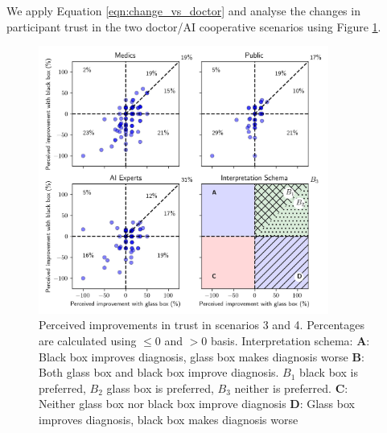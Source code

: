 \documentclass[manuscript,screen,review]{acmart}
\begin{document}










We apply Equation \ref{eqn:change_vs_doctor} and analyse the changes in participant trust in the two doctor/AI cooperative scenarios using Figure \ref{fig:improvement}.

\begin{figure}[h!]
    \centering
    \includegraphics[width=0.85\textwidth]{graphics/Doctor_improvements_cooperation_scatter.jpg}
    \caption{\centering Perceived improvements in trust in scenarios 3 and 4. Percentages are calculated using $\leq 0$ and $>0$ basis.\hspace{\textwidth} Interpretation schema: \textbf{A}: Black box improves diagnosis, glass box makes diagnosis worse \hspace{\textwidth} \textbf{B}: Both glass box and black box improve diagnosis. \textbf{$B_1$} black box is preferred, \textbf{$B_2$} glass box is preferred, $B_3$ neither is preferred. \textbf{C}: Neither glass box nor black box improve diagnosis \textbf{D}: Glass box improves diagnosis, black box makes diagnosis worse}
    \label{fig:improvement}
\end{figure}
\end{document}
